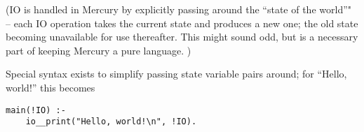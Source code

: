 (IO is handled in Mercury by explicitly passing around the ``state
of the world''" -- each IO operation takes the current state and
produces a new one; the old state becoming unavailable for use
thereafter.  This might sound odd, but is a necessary part of
keeping Mercury a pure language.  )

Special syntax exists to simplify passing state variable pairs
around; for ``Hello, world!'' this becomes
\begin{verbatim}
main(!IO) :-
    io__print("Hello, world!\n", !IO).
\end{verbatim}

